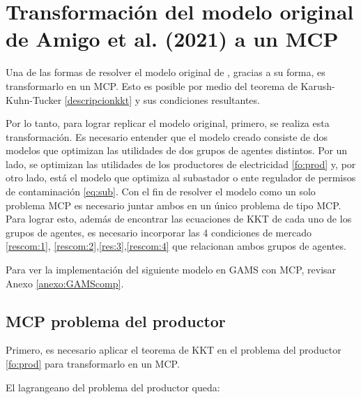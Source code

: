 \section{Transformación del modelo original de Amigo et al. (2021) a un MCP}

Una de las formas de resolver el modelo original de , gracias a su forma, es transformarlo en un MCP. Esto es posible por medio del teorema de Karush-Kuhn-Tucker \ref{descripcionkkt} y sus condiciones resultantes. 
\vspace{2.5mm}

Por lo tanto, para lograr replicar el modelo original, primero, se realiza esta transformación. Es necesario entender que el modelo creado consiste de dos modelos que optimizan las utilidades de dos grupos de agentes distintos. Por un lado, se optimizan las utilidades de los productores de electricidad \ref{fo:prod} y, por otro lado, está el modelo que optimiza al subastador o ente regulador de permisos de contaminación \ref{eq:sub}. Con el fin de resolver el modelo como un solo problema MCP es necesario juntar ambos en un único problema de tipo MCP. Para lograr esto, además de encontrar las ecuaciones de KKT de cada uno de los grupos de agentes, es necesario incorporar las 4 condiciones de mercado \ref{rescom:1}, \ref{rescom:2},\ref{res:3},\ref{rescom:4} que relacionan ambos grupos de agentes.

Para ver la implementación del siguiente modelo en GAMS con MCP, revisar Anexo \ref{anexo:GAMScomp}.

\subsection{MCP problema del productor}\label{MCPproductor}

Primero, es necesario aplicar el teorema de KKT en el problema del productor \ref{fo:prod} para transformarlo en un MCP.
\vspace{2.5mm}

El lagrangeano del problema del productor queda: 

